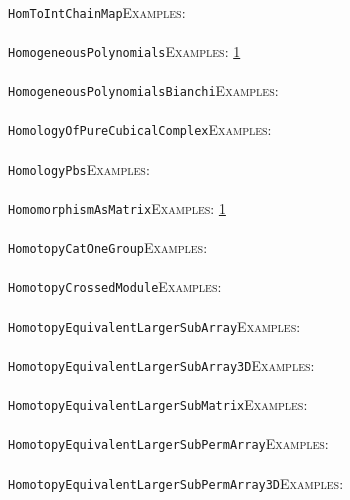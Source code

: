 \documentclass[a4paper,11pt]{report}
\begin{document}
{{ \\
 \texttt{HomToInt{\textunderscore}ChainMap}{\nobreakspace}{\nobreakspace}{\nobreakspace}{\nobreakspace}\textsc{Examples:} \\
 \\
 \texttt{HomogeneousPolynomials}{\nobreakspace}{\nobreakspace}{\nobreakspace}{\nobreakspace}\textsc{Examples:} \href{tutorial/chap10.html} {1}{\nobreakspace} \\
 \\
 \texttt{HomogeneousPolynomials{\textunderscore}Bianchi}{\nobreakspace}{\nobreakspace}{\nobreakspace}{\nobreakspace}\textsc{Examples:} \\
 \\
 \texttt{HomologyOfPureCubicalComplex}{\nobreakspace}{\nobreakspace}{\nobreakspace}{\nobreakspace}\textsc{Examples:} \\
 \\
 \texttt{HomologyPbs}{\nobreakspace}{\nobreakspace}{\nobreakspace}{\nobreakspace}\textsc{Examples:} \\
 \\
 \texttt{HomomorphismAsMatrix}{\nobreakspace}{\nobreakspace}{\nobreakspace}{\nobreakspace}\textsc{Examples:} \href{tutorial/chap10.html} {1}{\nobreakspace} \\
 \\
 \texttt{HomotopyCatOneGroup}{\nobreakspace}{\nobreakspace}{\nobreakspace}{\nobreakspace}\textsc{Examples:} \\
 \\
 \texttt{HomotopyCrossedModule}{\nobreakspace}{\nobreakspace}{\nobreakspace}{\nobreakspace}\textsc{Examples:} \\
 \\
 \texttt{HomotopyEquivalentLargerSubArray}{\nobreakspace}{\nobreakspace}{\nobreakspace}{\nobreakspace}\textsc{Examples:} \\
 \\
 \texttt{HomotopyEquivalentLargerSubArray3D}{\nobreakspace}{\nobreakspace}{\nobreakspace}{\nobreakspace}\textsc{Examples:} \\
 \\
 \texttt{HomotopyEquivalentLargerSubMatrix}{\nobreakspace}{\nobreakspace}{\nobreakspace}{\nobreakspace}\textsc{Examples:} \\
 \\
 \texttt{HomotopyEquivalentLargerSubPermArray}{\nobreakspace}{\nobreakspace}{\nobreakspace}{\nobreakspace}\textsc{Examples:} \\
 \\
 \texttt{HomotopyEquivalentLargerSubPermArray3D}{\nobreakspace}{\nobreakspace}{\nobreakspace}{\nobreakspace}\textsc{Examples:} \\
}}
\end{document}
